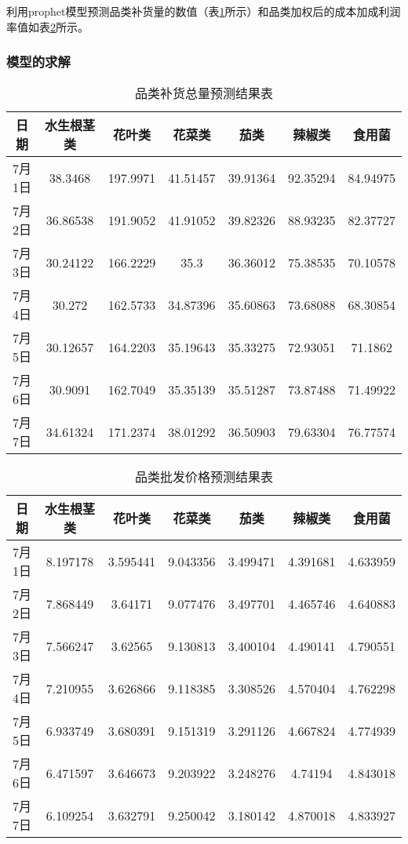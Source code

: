 \documentclass[withoutpreface,bwprint]{cumcmthesis} %
\begin{document}
利用prophet模型预测品类补货量的数值（表\ref{table}所示）和品类加权后的成本加成利润率值如表\ref{table1}所示。

\subsubsection{模型的求解}


\begin{longtable}{ccccccc}
	\caption{品类补货总量预测结果表}
	\label{table}\\
		\toprule[1.5pt]
  日期    & 水生根茎类  & 花叶类    & 花菜类    & 茄类     & 辣椒类    & 食用菌    \\
  \midrule[1pt]
  \endfirsthead
7月1日        & 38.3468        & 197.9971     & 41.51457     & 39.91364    & 92.35294     & 84.94975     \\
7月2日        & 36.86538       & 191.9052     & 41.91052     & 39.82326    & 88.93235     & 82.37727     \\
7月3日        & 30.24122       & 166.2229     & 35.3         & 36.36012    & 75.38535     & 70.10578     \\
7月4日        & 30.272         & 162.5733     & 34.87396     & 35.60863    & 73.68088     & 68.30854     \\
7月5日        & 30.12657       & 164.2203     & 35.19643     & 35.33275    & 72.93051     & 71.1862      \\
7月6日        & 30.9091        & 162.7049     & 35.35139     & 35.51287    & 73.87488     & 71.49922     \\
7月7日        & 34.61324       & 171.2374     & 38.01292     & 36.50903    & 79.63304     & 76.77574\\
\bottomrule[1.5pt]
	\end{longtable}


\begin{longtable}{ccccccc}
	\caption{品类批发价格预测结果表}
	\label{table1}\\
		\toprule[1.5pt]
 日期   & 水生根茎类  & 花叶类     & 花菜类    & 茄类     & 辣椒类    & 食用菌    \\
  \midrule[1pt]
  \endfirsthead
7月1日 & 8.197178 & 3.595441 & 9.043356 & 3.499471 & 4.391681 & 4.633959 \\
7月2日 & 7.868449 & 3.64171  & 9.077476 & 3.497701 & 4.465746 & 4.640883 \\
7月3日 & 7.566247 & 3.62565  & 9.130813 & 3.400104 & 4.490141 & 4.790551 \\
7月4日 & 7.210955 & 3.626866 & 9.118385 & 3.308526 & 4.570404 & 4.762298 \\
7月5日 & 6.933749 & 3.680391 & 9.151319 & 3.291126 & 4.667824 & 4.774939 \\
7月6日 & 6.471597 & 3.646673 & 9.203922 & 3.248276 & 4.74194  & 4.843018 \\
7月7日 & 6.109254 & 3.632791 & 9.250042 & 3.180142 & 4.870018 & 4.833927\\
\bottomrule[1.5pt]
	\end{longtable}
\end{document}
